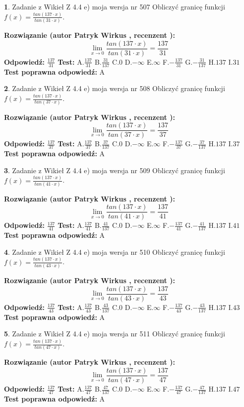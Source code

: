 \documentclass[12pt, a4paper]{article}
\theoremstyle{definition} %
\newtheorem{zad}{}
\newcommand{\zadStart}[1]{\begin{zad}#1\newline}
\newcommand{\zadStop}{\end{zad}}
\newcommand{\rozwStart}[2]{\noindent \textbf{Rozwiązanie (autor #1 , recenzent #2): }\newline}
\newcommand{\rozwStop}{\newline}
\newcommand{\odpStart}{\noindent \textbf{Odpowiedź:}\newline}
\newcommand{\odpStop}{\newline}
\newcommand{\testStart}{\noindent \textbf{Test:}\newline}
\newcommand{\testStop}{\newline}
\newcommand{\kluczStart}{\noindent \textbf{Test poprawna odpowiedź:}\newline}
\newcommand{\kluczStop}{\newline}
\begin{document}
\zadStart{Zadanie z Wikieł Z 4.4 e) moja wersja nr 507}
Obliczyć granicę funkcji $f(x)=\frac{tan(137\cdot x)}{tan(31\cdot x)}$.
\zadStop
\rozwStart{Patryk Wirkus}{}
$$\lim\limits_{x\to 0}\frac{tan(137\cdot x)}{tan(31\cdot x)}=
\frac{137}{31}$$
\rozwStop
\odpStart
$\frac{137}{31}$
\odpStop
\testStart
A.$\frac{137}{31}$
B.$\frac{31}{137}$
C.$0$
D.$-\infty$
E.$\infty$
F.$-\frac{137}{31}$
G.$-\frac{31}{137}$
H.$137$
I.$31$
\testStop
\kluczStart
A
\kluczStop



\zadStart{Zadanie z Wikieł Z 4.4 e) moja wersja nr 508}
Obliczyć granicę funkcji $f(x)=\frac{tan(137\cdot x)}{tan(37\cdot x)}$.
\zadStop
\rozwStart{Patryk Wirkus}{}
$$\lim\limits_{x\to 0}\frac{tan(137\cdot x)}{tan(37\cdot x)}=
\frac{137}{37}$$
\rozwStop
\odpStart
$\frac{137}{37}$
\odpStop
\testStart
A.$\frac{137}{37}$
B.$\frac{37}{137}$
C.$0$
D.$-\infty$
E.$\infty$
F.$-\frac{137}{37}$
G.$-\frac{37}{137}$
H.$137$
I.$37$
\testStop
\kluczStart
A
\kluczStop



\zadStart{Zadanie z Wikieł Z 4.4 e) moja wersja nr 509}
Obliczyć granicę funkcji $f(x)=\frac{tan(137\cdot x)}{tan(41\cdot x)}$.
\zadStop
\rozwStart{Patryk Wirkus}{}
$$\lim\limits_{x\to 0}\frac{tan(137\cdot x)}{tan(41\cdot x)}=
\frac{137}{41}$$
\rozwStop
\odpStart
$\frac{137}{41}$
\odpStop
\testStart
A.$\frac{137}{41}$
B.$\frac{41}{137}$
C.$0$
D.$-\infty$
E.$\infty$
F.$-\frac{137}{41}$
G.$-\frac{41}{137}$
H.$137$
I.$41$
\testStop
\kluczStart
A
\kluczStop



\zadStart{Zadanie z Wikieł Z 4.4 e) moja wersja nr 510}
Obliczyć granicę funkcji $f(x)=\frac{tan(137\cdot x)}{tan(43\cdot x)}$.
\zadStop
\rozwStart{Patryk Wirkus}{}
$$\lim\limits_{x\to 0}\frac{tan(137\cdot x)}{tan(43\cdot x)}=
\frac{137}{43}$$
\rozwStop
\odpStart
$\frac{137}{43}$
\odpStop
\testStart
A.$\frac{137}{43}$
B.$\frac{43}{137}$
C.$0$
D.$-\infty$
E.$\infty$
F.$-\frac{137}{43}$
G.$-\frac{43}{137}$
H.$137$
I.$43$
\testStop
\kluczStart
A
\kluczStop



\zadStart{Zadanie z Wikieł Z 4.4 e) moja wersja nr 511}
Obliczyć granicę funkcji $f(x)=\frac{tan(137\cdot x)}{tan(47\cdot x)}$.
\zadStop
\rozwStart{Patryk Wirkus}{}
$$\lim\limits_{x\to 0}\frac{tan(137\cdot x)}{tan(47\cdot x)}=
\frac{137}{47}$$
\rozwStop
\odpStart
$\frac{137}{47}$
\odpStop
\testStart
A.$\frac{137}{47}$
B.$\frac{47}{137}$
C.$0$
D.$-\infty$
E.$\infty$
F.$-\frac{137}{47}$
G.$-\frac{47}{137}$
H.$137$
I.$47$
\testStop
\kluczStart
A
\kluczStop
\end{document}
